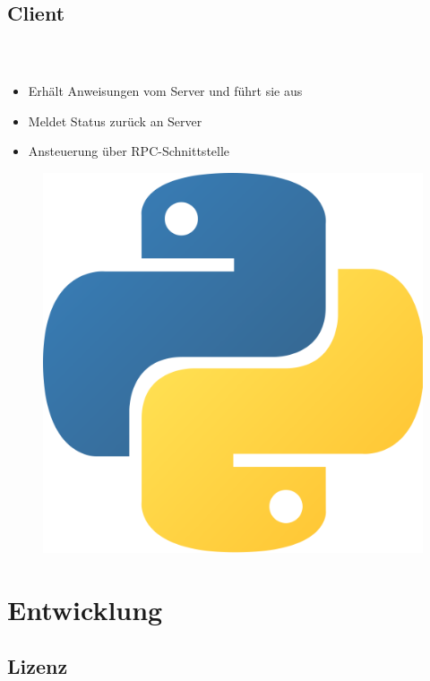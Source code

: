 \documentclass[accentcolor=tud1b,colorbacktitle,landscape,german,presentation]{tudbeamer}
\newcommand{\ftitle}{

	\frametitle{\insertsectionhead \\ {\small \insertsubsectionhead}}
}
\begin{document}
\subsection{Client}
\begin{frame}
	\ftitle
	\begin{itemize}
		\item Erhält Anweisungen vom Server und führt sie aus\pause
		\item Meldet Status zurück an Server\pause
		\item Ansteuerung über RPC-Schnittstelle\pause
	\end{itemize}
	\vspace{0.5cm}
	\begin{figure}
		\centering
		\includegraphics[scale=0.05]{python}
	\end{figure}
\end{frame}

\section{Entwicklung}
\subsection{Lizenz}
\end{document}
